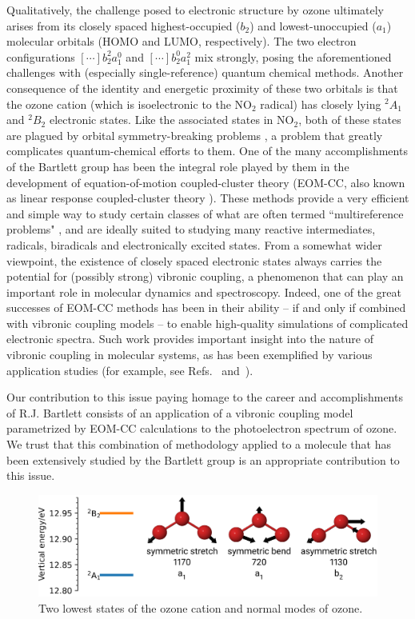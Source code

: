 \documentclass[12pt,a4paper,prb,aps,superscriptaddress]{revtex4}
\begin{document}
Qualitatively, the challenge posed to electronic structure by ozone ultimately
arises from its closely spaced highest-occupied ($b_2$) and lowest-unoccupied
($a_1$) molecular orbitals (HOMO and LUMO, respectively).  The two electron
configurations $[\cdots]b_2^2 a_1^0$ and $[\cdots]b_2^0 a_1^2$ mix strongly,
posing the aforementioned challenges with (especially single-reference)
quantum chemical methods.   Another consequence of the identity and energetic
proximity of these two orbitals is that the ozone cation (which is
isoelectronic to the NO$_2$ radical) has closely lying $^2A_1$ and $^2B_2$
electronic states.   Like the associated states in NO$_2$, both of these
states are plagued by orbital symmetry-breaking problems
\cite{Davidson:SymmBreak:76}, a problem that greatly complicates
quantum-chemical efforts to them.   One of the many accomplishments of the
Bartlett group has been the integral role played by them in the development of
equation-of-motion coupled-cluster theory \cite{Stanton:93:EOMCC,
Nooijen:EOMEA:95, Bartlett:CC_review:07} (EOM-CC, also known as linear
response coupled-cluster theory \cite{Koch:90:LinResp}). These methods provide
a very efficient and simple way to study certain classes of what are often
termed ``multireference problems" \cite{Krylov:EOMRev:07}, and are ideally
suited to studying many reactive intermediates, radicals, biradicals and
electronically excited states.   From a somewhat wider viewpoint, the
existence of closely spaced electronic states always carries the potential for
(possibly strong) vibronic coupling, a phenomenon that can play an important
role in molecular dynamics and spectroscopy.  Indeed, one of the great
successes of EOM-CC methods has been in their ability -- if and only if
combined with vibronic coupling models -- to enable high-quality simulations
of complicated electronic spectra.   Such work provides important insight into
the nature of vibronic coupling in molecular systems, as has been exemplified
by various application studies (for example, see Refs.~\cite{Stanton:NO3:07}
and~\cite{Koppel:02}).

Our contribution to this issue paying homage to the career and accomplishments
of R.J. Bartlett consists of an application of a vibronic coupling model
parametrized by EOM-CC calculations to the photoelectron spectrum of ozone.
We trust that this combination of methodology applied to a molecule that has
been extensively studied by the Bartlett group is an appropriate contribution
to this issue.

\begin{figure}
    \includegraphics[width = 16 cm]{./figures/ozone_intro}
    \caption{ 
        Two lowest states of the ozone cation and normal modes of ozone.
    }
    \label{fig:ozone_intro}
\end{figure}
\end{document}
